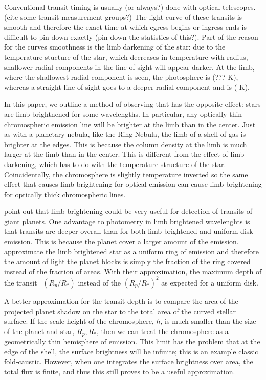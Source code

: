 \documentclass[manuscript]{aastex}
\begin{document}
Conventional transit timing is usually (or always?) done with optical
telescopes. (cite some transit measurement groups?) The light curve of
these transits is smooth and therefore the exact time at which egress
begins or ingress ends is difficult to pin down exactly (pin down the
statistics of this?). Part of the reason for the curves smoothness is
the limb darkening of the star: due to the temperature stucture of the
star, which decreases in temperature with radius, shallower radial components in the line of sight will appear darker. At the limb, where the shallowest radial component is seen, the photosphere is (??? K), whereas a straight line of sight goes to a deeper radial component and is ( K).

In this paper, we outline a method of observing that has the opposite
effect: stars are limb brightnened for some wavelengths. In
particular, any optically thin chromospheric emission line will be
brighter at the limb than in the center. Just as with a planetary
nebula, like the Ring Nebula, the limb of a shell of gas is brighter
at the edges. This is because the column density at the limb is much
larger at the limb than in the center. This is different from the effect of limb darkening, which has to do with the temperature structure of the star. Coincidentally, the chromosphere is slightly temperature inverted so the same effect that causes limb brightening for optical emission can cause limb brightening for optically thick chromospheric lines.

\citet{2009ApJ...701.1616A} point out that limb brightening could be
very useful for detection of transits of giant planets. One advantage
to photometry in limb brightened wavelenghts is that transits are
deeper overall than for both limb brightened and uniform disk
emission. This is because the planet cover a larger amount of the
emission. \citet{2009Apj...701.1616A} approximate the limb brightened
star as a uniform ring of emission and therefore the amount of light
the planet blocks is simply the fraction of the ring covered instead
of the fraction of areas. With their approximation, the maximum depth
of the transit=$(R_p/R_*)$ instead of the $(R_p/R_*)^2$
as expected for a uniform disk.

A better approximation for the transit depth is to compare the area of
the projected planet shadow on the star to the total area of the
curved stellar surface. If the scale-height of the chromosphere, $h$,
is much smaller than the size of the planet and star, $R_p, R_*$, then
we can treat the chromosphere as a geometrically thin hemisphere of
emission.  This limit has the problem that at the edge of the shell,
the surface brightness will be infinite; this is an example classic
fold-caustic.  However, when one integrates the surface brightness
over area, the total flux is finite, and thus this still proves to be
a useful approximation.
\end{document}
